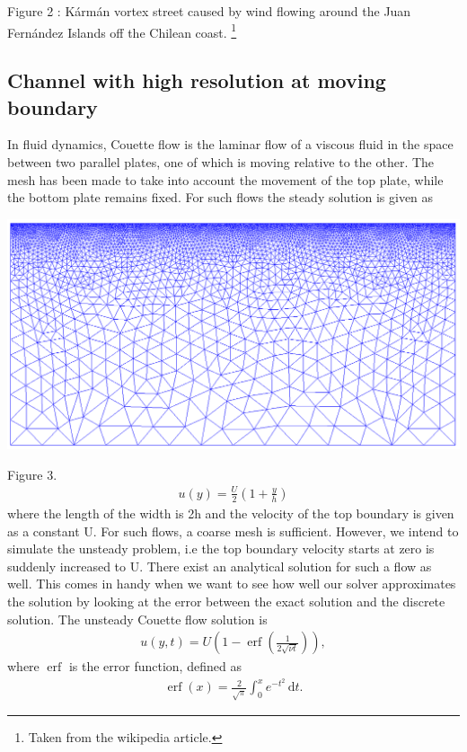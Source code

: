 \documentclass[11pt]{article}
\begin{document}
{Figure 2 : \tiny{K\'arm\'an vortex street caused by wind flowing around the Juan 
Fern\'andez Islands off the Chilean coast.} \footnote{Taken from the wikipedia article.}
\normalsize{}


\subsection{Channel with high resolution at moving boundary} 
In fluid dynamics, Couette flow is the laminar flow of a viscous fluid in the space between 
two parallel plates, one of which is moving relative to the other. The mesh has been made
to take into account the movement of the top plate, while the bottom plate remains fixed.
For such flows the steady solution is given as 

\hspace{25mm}\includegraphics[scale=0.2]{figures/dolfin_plot_1.png} 

\vspace{-1mm}\hspace{60mm}Figure 3.\\

\begin{align}
\label{steadyCouette}
u(y) = \frac{U}{2} \left(1 + \frac{y}{h} \right)
\end{align}
where the length of the width is 2h and the velocity of the top boundary is given as a 
constant U. For such flows, a coarse mesh is sufficient. However, we intend to simulate
the unsteady problem, i.e the top boundary velocity starts at zero is suddenly
increased to U. There exist an analytical solution for such a flow as well. This comes
in handy when we want to see how well our solver approximates the solution by 
looking at the error between the exact solution and the discrete solution. The 
unsteady Couette flow solution is \cite{12}
\begin{align}
\label{unsteadyCouette}
u(y,t) = U\left(1 - \operatorname{erf}\left(\frac{1}{2\sqrt{\nu t}}\right) \right),
\end{align}
where $\operatorname{erf}$ is the error function, defined as
\begin{align*}
\operatorname{erf}(x) = \frac{2}{\sqrt{\pi}}\int_{0}^x e^{-t^2}\,\mathrm dt.
\end{align*}


}
\end{document}
